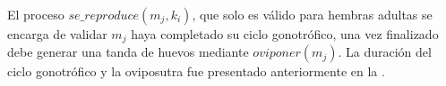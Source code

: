 El proceso $se\_reproduce(m_{j}, k_{i})$, que solo es válido para hembras adultas se encarga de
validar $m_{j}$ haya completado su ciclo gonotrófico, una vez finalizado debe generar una tanda de
huevos mediante $oviponer(m_{j})$. La duración del ciclo gonotrófico y la oviposutra fue presentado
anteriormente en la .



